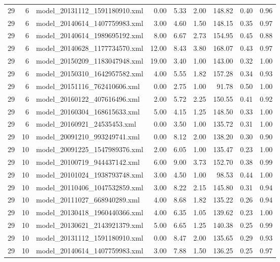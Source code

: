 \begin{table}[ht]
\begin{tabular}{rrlrrrrrr}
   29 &   6 & model\_20131112\_1591180910.xml & 0.00 & 5.33 & 2.00 & 148.82 & 0.40 & 0.96 \\ 
   29 &   6 & model\_20140614\_1407759983.xml & 3.00 & 4.60 & 1.50 & 148.15 & 0.35 & 0.97 \\ 
   29 &   6 & model\_20140614\_1989695192.xml & 8.00 & 6.67 & 2.73 & 154.95 & 0.45 & 0.88 \\ 
   29 &   6 & model\_20140628\_1177734570.xml & 12.00 & 8.43 & 3.80 & 168.07 & 0.43 & 0.97 \\ 
   29 &   6 & model\_20150209\_1183047948.xml & 19.00 & 3.40 & 1.00 & 143.00 & 0.32 & 1.00 \\ 
   29 &   6 & model\_20150310\_1642957582.xml & 4.00 & 5.55 & 1.82 & 157.28 & 0.34 & 0.93 \\ 
   29 &   6 & model\_20151116\_762410606.xml & 0.00 & 2.75 & 1.00 & 91.78 & 0.50 & 1.00 \\ 
   29 &   6 & model\_20160122\_407616496.xml & 2.00 & 5.72 & 2.25 & 150.55 & 0.41 & 0.92 \\ 
   29 &   6 & model\_20160304\_168615633.xml & 5.00 & 4.15 & 1.25 & 148.50 & 0.33 & 1.00 \\ 
   29 &   6 & model\_20160921\_24535453.xml & 0.00 & 3.50 & 1.00 & 135.72 & 0.31 & 1.00 \\ 
   29 &  10 & model\_20091210\_993249741.xml & 0.00 & 8.12 & 2.00 & 138.20 & 0.30 & 0.90 \\ 
   29 &  10 & model\_20091225\_1547989376.xml & 2.00 & 6.05 & 1.00 & 135.47 & 0.23 & 1.00 \\ 
   29 &  10 & model\_20100719\_944437142.xml & 6.00 & 9.00 & 3.73 & 152.70 & 0.38 & 0.99 \\ 
   29 &  10 & model\_20101024\_1938793748.xml & 3.00 & 4.50 & 1.00 & 98.53 & 0.44 & 1.00 \\ 
   29 &  10 & model\_20110406\_1047532859.xml & 3.00 & 8.22 & 2.15 & 145.80 & 0.31 & 0.94 \\ 
   29 &  10 & model\_20111027\_668940289.xml & 4.00 & 8.68 & 1.82 & 135.22 & 0.26 & 0.94 \\ 
   29 &  10 & model\_20130418\_1960440366.xml & 4.00 & 6.35 & 1.05 & 139.62 & 0.23 & 1.00 \\ 
   29 &  10 & model\_20130621\_2143921379.xml & 5.00 & 6.65 & 1.25 & 140.38 & 0.25 & 0.99 \\ 
   29 &  10 & model\_20131112\_1591180910.xml & 0.00 & 8.47 & 2.00 & 135.65 & 0.29 & 0.93 \\ 
   29 &  10 & model\_20140614\_1407759983.xml & 3.00 & 7.88 & 1.50 & 136.25 & 0.25 & 0.97 \\ 

\end{tabular}
\end{table}
